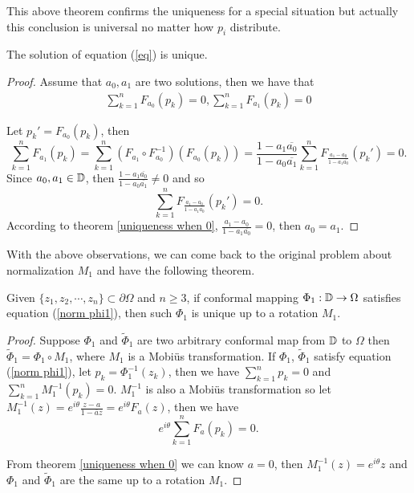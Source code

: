 \documentclass[review,onefignum,onetabnum]{siamonline190516}
\begin{document}
    This above theorem confirms the uniqueness for a special situation but actually this conclusion is universal no matter how $p_i$ distribute.

    \begin{theorem}\label{uniqueness}
        The solution of equation (\ref{eq}) is unique.
    \end{theorem}

    \begin{proof}
        Assume that $a_0, a_1$ are two solutions, then we have that
        \begin{align*}
            \sum_{k=1}^n F_{a_0}(p_k) = 0,\sum_{k=1}^n F_{a_1}(p_k) = 0
        \end{align*}
        
        Let $p_k' = F_{a_0}(p_k)$, then
        \begin{equation*}
            \sum_{k=1}^n F_{a_1} (p_k)
            = \sum_{k=1}^n (F_{a_1} \circ F_{a_0}^{-1})(F_{a_0}(p_k))
            = \frac{1- a_1 \overline{a_0}}{1- a_0 \overline{a_1}}\sum_{k=1}^n F_{\frac{a_1-a_0}{1-a_1\overline{a_0}}}(p_k') = 0.
        \end{equation*}
        Since $a_0, a_1 \in \mathbb{D}$, then $\frac{1- a_1 \overline{a_0}}{1- a_0 \overline{a_1}} \neq 0$ and so
        $$\sum_{k=1}^n F_{\frac{a_1-a_0}{1-a_1\overline{a_0}}}(p_k') = 0.$$
        According to theorem \ref{uniqueness when 0}, $\frac{a_1-a_0}{1-a_1\overline{a_0}} = 0$, then $a_0 = a_1$.
    \end{proof}

    With the above observations, we can come back to the original problem about normalization $M_1$ and have the following theorem.

    \begin{theorem}\label{unique up to a rotation}
        Given $\{z_1, z_2, \cdots, z_n\} \subset \partial \Omega$ and $n \ge 3$, if conformal mapping $\Phi_1: \mathbb{D} \rightarrow \Omega$ satisfies equation (\ref{norm phi1}), then such $\Phi_1$ is unique up to a rotation $M_1$.
    \end{theorem}


    \begin{proof}
        Suppose $\Phi_1$ and $\tilde{\Phi}_1$ are two arbitrary conformal map from $\mathbb{D}$ to $\Omega$  then $\tilde{\Phi}_1 = \Phi_1 \circ M_1$, where $M_1$ is a Mobi\"us transformation. If $\Phi_1$, $\tilde{\Phi}_1 $ satisfy equation (\ref{norm phi1}), let $p_k = \Phi_1^{-1}(z_k)$, then we have $\sum_{k=1}^n p_k = 0$ and $\sum_{k=1}^n M_1^{-1} (p_k) = 0$. $M_1^{-1}$ is also a Mobi\"us transformation so let $M_1^{-1}(z) = e^{i \theta}\frac{z - a}{1 - \overline{a} z} = e^{i \theta} F_a(z)$, then we have
        \begin{equation*}
            e^{i \theta} \sum_{k=1}^n F_a(p_k) = 0.
        \end{equation*}

        From theorem \ref{uniqueness when 0} we can know $a = 0$, then $M_1^{-1}(z) = e^{i \theta} z$ and $\Phi_1$ and $\tilde{\Phi}_1$ are the same up to a rotation $M_1$.
    \end{proof}
\end{document}
